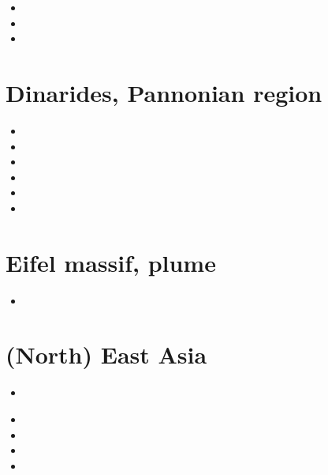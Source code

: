 \begin{small}
\begin{itemize}
\item[\twothousandfive]
\item[\twothousandeleven]
\item[\twothousandtwentyfour]
\end{itemize}
\end{small}

\section{Dinarides, Pannonian region} 

\begin{small}
\begin{itemize}
\item[2001]
\item[2002]
\item[2019]
\item[2022]
\item[2024]
\item[2024]
\end{itemize}
\end{small}


\section{Eifel massif, plume}

\begin{small}
\begin{itemize}
\item[2026] 
\end{itemize}
\end{small}

\section{(North) East Asia}

\begin{small}
\begin{itemize}
\item[\twothousandfifteen]
 \\
\item[2017]
\item[\twothousandeighteen]
\item[\twothousandtwentyone] 
\item[\twothousandtwentytwo] 
\end{itemize}
\end{small}


